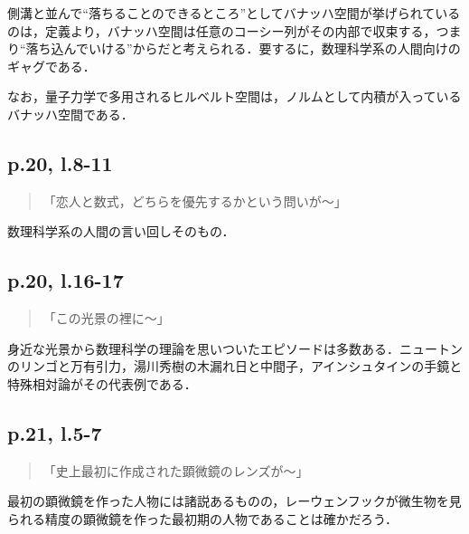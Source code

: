 \documentclass[10pt, a5paper, twoside]{jsarticle}
\theoremstyle{definition}
\begin{document}
                側溝と並んで“落ちることのできるところ”としてバナッハ空間が挙げられているのは，定義より，バナッハ空間は任意のコーシー列がその内部で収束する，つまり“落ち込んでいける”からだと考えられる．要するに，数理科学系の人間向けのギャグである．

                なお，量子力学で多用されるヒルベルト空間は，ノルムとして内積が入っているバナッハ空間である．

            \subsection{p.20, l.8-11}

                \begin{quote}

                    「恋人と数式，どちらを優先するかという問いが〜」

                \end{quote}

                数理科学系の人間の言い回しそのもの．

            \subsection{p.20, l.16-17}

                \begin{quote}

                    「この光景の裡に〜」

                \end{quote}

                身近な光景から数理科学の理論を思いついたエピソードは多数ある．ニュートンのリンゴと万有引力，湯川秀樹の木漏れ日と中間子，アインシュタインの手鏡と特殊相対論がその代表例である．

            \subsection{p.21, l.5-7}

                \begin{quote}

                    「史上最初に作成された顕微鏡のレンズが〜」

                \end{quote}

                最初の顕微鏡を作った人物には諸説あるものの，レーウェンフックが微生物を見られる精度の顕微鏡を作った最初期の人物であることは確かだろう．
\end{document}

